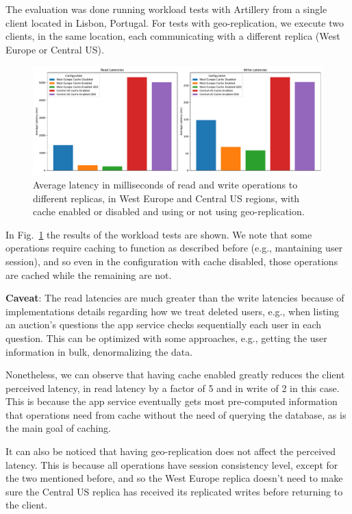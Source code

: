 \documentclass[runningheads]{llncs}
\begin{document}
The evaluation was done running workload tests with Artillery from a single client located in Lisbon, Portugal. For tests with geo-replication, we execute two clients, in the same location, each communicating with a different replica (West Europe or Central US).

\begin{figure}
    \includegraphics[width=\textwidth]{latencies.pdf}
    \caption{Average latency in milliseconds of read and write operations to different replicas, in West Europe and Central US regions, with cache enabled or disabled and using or not using geo-replication.} \label{fig:latencies}
\end{figure}

In Fig.~\ref{fig:latencies} the results of the workload tests are shown. We note that some operations require caching to function as described before (e.g., mantaining user session), and so even in the configuration with cache disabled, those operations are cached while the remaining are not.

\textbf{Caveat}: The read latencies are much greater than the write latencies because of implementations details regarding how we treat deleted users, e.g., when listing an auction's questions the app service checks sequentially each user in each question. This can be optimized with some approaches, e.g., getting the user information in bulk, denormalizing the data.

Nonetheless, we can observe that having cache enabled greatly reduces the client perceived latency, in read latency by a factor of 5 and in write of 2 in this case. This is because the app service eventually gets most pre-computed information that operations need from cache without the need of querying the database, as is the main goal of caching.

It can also be noticed that having geo-replication does not affect the perceived latency. This is because all operations have session consistency level, except for the two mentioned before, and so the West Europe replica doesn't need to make sure the Central US replica has received its replicated writes before returning to the client. 
\end{document}

